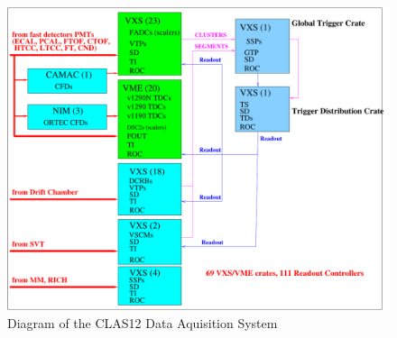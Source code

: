 \begin{figure}[hbt]
	\centering
	\includegraphics[width=1.0\columnwidth,keepaspectratio]{img/CLAS12_HARDWARE_2.pdf}
	\caption{Diagram of the CLAS12 Data Aquisition System}
	\label{fig:DAQdiagram}
\end{figure}

